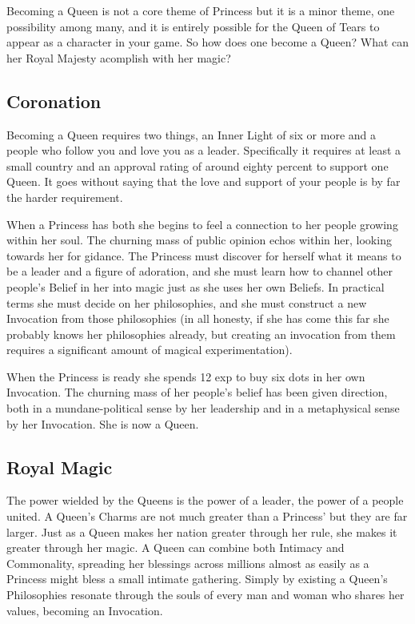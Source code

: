 Becoming a Queen is not a core theme of Princess but it is a minor theme, one possibility among many, and it is entirely possible for the Queen of Tears to appear as a character in your game. So how does one become a Queen? What can her Royal Majesty acomplish with her magic? 

\subsection*{Coronation}
Becoming a Queen requires two things, an Inner Light of six or more and a people who follow you and love you as a leader. Specifically it requires at least a small country and an approval rating of around eighty percent to support one Queen. It goes without saying that the love and support of your people is by far the harder requirement. 

When a Princess has both she begins to feel a connection to her people growing within her soul. The churning mass of public opinion echos within her, looking towards her for gidance. The Princess must discover for herself what it means to be a leader and a figure of adoration, and she must learn how to channel other people's Belief in her into magic just as she uses her own Beliefs. In practical terms she must decide on her philosophies, and she must construct a new Invocation from those philosophies (in all honesty, if she has come this far she probably knows her philosophies already, but creating an invocation from them requires a significant amount of magical experimentation). 

When the Princess is ready she spends 12 exp to buy six dots in her own Invocation. The churning mass of her people's belief has been given direction, both in a mundane-political sense by her leadership and in a metaphysical sense by her Invocation. She is now a Queen.

\subsection*{Royal Magic}

The power wielded by the Queens is the power of a leader, the power of a people united. A Queen's Charms are not much greater than a Princess' but they are far larger. Just as a Queen makes her nation greater through her rule, she makes it greater through her magic. A Queen can combine both Intimacy and Commonality, spreading her blessings across millions almost as easily as a Princess might bless a small intimate gathering. Simply by existing a Queen's Philosophies resonate through the souls of every man and woman who shares her values, becoming an Invocation. 

